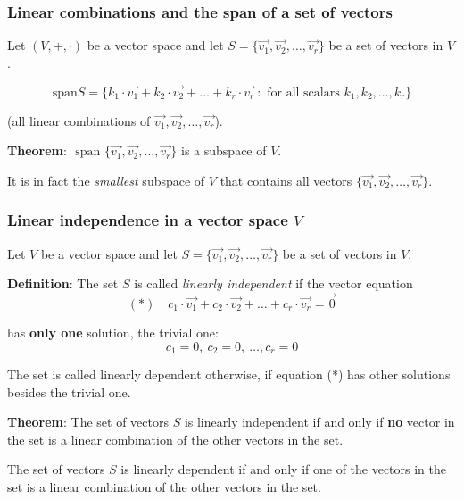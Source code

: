 \begin{frame}[fragile]
\frametitle{Linear combinations and the span of a set of vectors}

Let $(V, +, \cdot)$ be a vector space and let $S = \{ \vec{v_1}, \vec{v_2}, \ldots, \vec{v_r} \}$ be a set of vectors in $V$.

$$\text{span} S = \{  k_1 \cdot \vec{v_1} + k_2 \cdot \vec{v_2} + \ldots + k_r \cdot \vec{v_r}  \ \colon  \text{ for all scalars } k_1, k_2, \ldots, k_r \}$$

(all linear combinations of $\vec{v_1}, \vec{v_2}, \ldots, \vec{v_r}$).

\bigskip


\textbf{Theorem}: $\text{ span }   \{ \vec{v_1}, \vec{v_2}, \ldots, \vec{v_r} \}$ is a subspace of $V$.

It is in fact the {\em smallest} subspace of $V$ that contains all vectors $\{ \vec{v_1}, \vec{v_2}, \ldots, \vec{v_r} \}$.

\end{frame}


\begin{frame}[fragile]
\frametitle{Linear independence in a vector space $V$}

Let $V$ be a vector space and let $S = \{ \vec{v_1}, \vec{v_2}, \ldots, \vec{v_r} \}$ be a set of vectors in $V$.



\textbf{Definition}: The set  $S$ is called {\em linearly independent} if the vector equation
\begin{equation*}
(*) \quad  c_1 \cdot \vec{v_1} + c_2 \cdot \vec{v_2} + \ldots + c_r \cdot \vec{v_r} = \vec{0}
\end{equation*}


has \textbf{only one} solution, the trivial one:
$$c_1 = 0, \ c_2 = 0, \ \ldots, c_r = 0$$

The set is called linearly dependent otherwise, if equation (*) has other solutions besides the trivial one.

\textbf{Theorem}: The set of vectors $S$ is linearly independent if and only if \textbf{no} vector in the set is a linear combination of the other vectors in the set.

The set of vectors $S$ is linearly dependent if and only if one of the vectors in the set is a linear combination of the other vectors in the set.
\end{frame}




